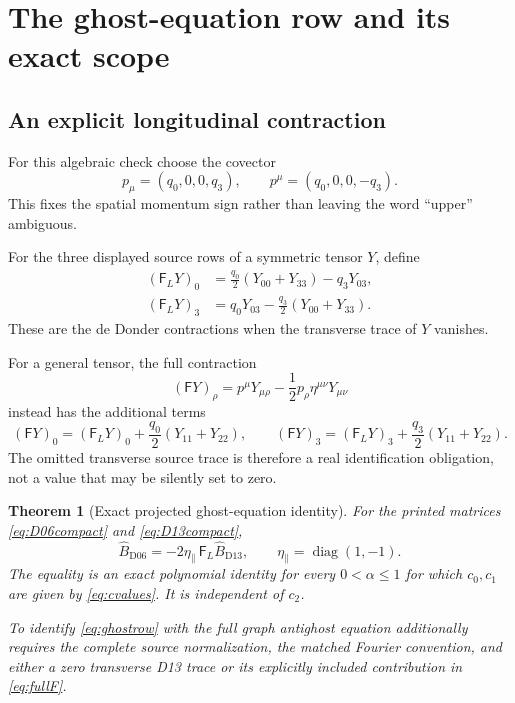 \documentclass[11pt,a4paper]{article}
\DeclareMathOperator{\diag}{diag}
\theoremstyle{plain}
\newtheorem{theorem}{Theorem}[section]
\theoremstyle{definition}
\theoremstyle{remark}
\numberwithin{equation}{section}
\begin{document}
\section{The ghost-equation row and its exact scope}
\label{sec:ghost}

\subsection{An explicit longitudinal contraction}

For this algebraic check choose the covector
\[
p_\mu=(q_0,0,0,q_3),\qquad
p^\mu=(q_0,0,0,-q_3).
\]
This fixes the spatial momentum sign rather than leaving the
word ``upper'' ambiguous.

For the three displayed source rows of a symmetric tensor \(Y\),
define
\begin{align}
(\mathsf F_LY)_0
 &=\frac{q_0}{2}(Y_{00}+Y_{33})-q_3Y_{03},\nonumber\\
(\mathsf F_LY)_3
 &=q_0Y_{03}-\frac{q_3}{2}(Y_{00}+Y_{33}).
\label{eq:FL}
\end{align}
These are the de Donder contractions when the transverse trace
of \(Y\) vanishes.

For a general tensor, the full contraction
\[
(\mathsf FY)_\rho
 =p^\mu Y_{\mu\rho}
  -\frac12p_\rho\eta^{\mu\nu}Y_{\mu\nu}
\]
instead has the additional terms
\begin{equation}
(\mathsf FY)_0=(\mathsf F_LY)_0
 +\frac{q_0}{2}(Y_{11}+Y_{22}),\qquad
(\mathsf FY)_3=(\mathsf F_LY)_3
 +\frac{q_3}{2}(Y_{11}+Y_{22}).
\label{eq:fullF}
\end{equation}
The omitted transverse source trace is therefore a real
identification obligation, not a value that may be silently
set to zero.

\begin{theorem}[Exact projected ghost-equation identity]
\label{thm:ghost}
For the printed matrices \eqref{eq:D06compact} and
\eqref{eq:D13compact},
\begin{equation}
\widehat B_{\mathrm{D06}}
 =-2\eta_\parallel\,
 \mathsf F_L\widehat B_{\mathrm{D13}},
\qquad
\eta_\parallel=\diag(1,-1).
\label{eq:ghostrow}
\end{equation}
The equality is an exact polynomial identity for every
\(0<\alpha\le1\) for which \(c_0,c_1\) are given by
\eqref{eq:cvalues}. It is independent of \(c_2\).

To identify \eqref{eq:ghostrow} with the full graph
antighost equation additionally requires the complete source
normalization, the matched Fourier convention, and either a
zero transverse D13 trace or its explicitly included contribution
in \eqref{eq:fullF}.
\end{theorem}
\end{document}
